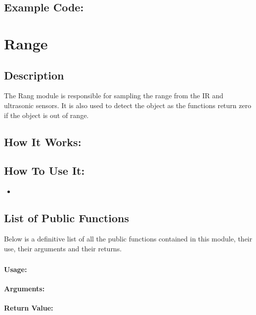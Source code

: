 \documentclass[]{report}
\begin{document}
\section{Example Code:}

\chapter{Range}
\section{Description}
The Rang module is responsible for sampling the range from the IR and ultrasonic sensors. It is also used to detect the object as the functions return zero if the object is out of range.

\section{How It Works:}

\section{How To Use It:}
\begin{itemize}
	\item 
\end{itemize}

\section{List of Public Functions}
Below is a definitive list of all the public functions contained in this module, their use, their arguments and their returns.

\subsection{}
\subsubsection{Usage:}

\subsubsection{Arguments:}

\subsubsection{Return Value:}
\end{document}
